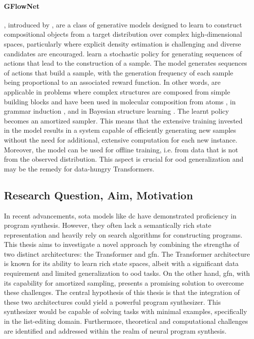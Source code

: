 \paragraph*{GFlowNet}
, introduced by \citet{bengioFlowNetworkBased2021}, are a class of generative models designed to learn to construct compositional objects from a target distribution over complex high-dimensional spaces, particularly where explicit density estimation is challenging and diverse candidates are encouraged.  learn a stochastic policy for generating sequences of actions that lead to the construction of a sample. The model generates sequences of actions that build a sample, with the generation frequency of each sample being proportional to an associated reward function.
In other words,  are applicable in problems where complex structures are composed from simple building blocks and have been used in molecular composition from atoms \cite{bengioFlowNetworkBased2021}, in grammar induction \cite{Hu_Malkin_Jain_Everett_Graikos_Bengio_2023}, and in Bayesian structure learning \cite{deleuBayesianStructureLearning2022}. The learnt policy becomes an amortized sampler. This means that the extensive training invested in the model results in a system capable of efficiently generating new samples without the need for additional, extensive computation for each new instance. Moreover, the model can be used for offline training, i.e. from data that is not from the observed distribution. This aspect is crucial for \acrshort{ood} generalization and may be the remedy for data-hungry Transformers.

\subsection{Research Question, Aim, Motivation}
In recent advancements, \acrfull{sota} models like \acrlong{dc} have demonstrated proficiency in program synthesis. However, they often lack a semantically rich state representation and heavily rely on search algorithms for constructing programs. This thesis aims to investigate a novel approach by combining the strengths of two distinct architectures: the Transformer and \acrshort{gfn}. The Transformer architecture is known for its ability to learn rich state spaces, albeit with a significant data requirement and limited generalization to \acrlong{ood} tasks. On the other hand, \acrshort{gfn}, with its capability for amortized sampling, presents a promising solution to overcome these challenges. The central hypothesis of this thesis is that the integration of these two architectures could yield a powerful program synthesizer. This synthesizer would be capable of solving tasks with minimal examples, specifically in the list-editing domain. 
Furthermore, theoretical and computational challenges are identified and addressed within the realm of neural program synthesis.

